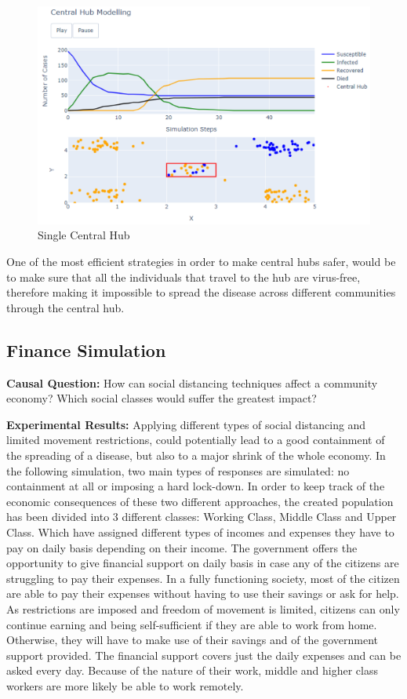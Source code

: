 \begin{figure}[ht!]%
    \centering
    \includegraphics[width=0.85\linewidth]{latex/images/hubs1.pdf}
    \caption{Single Central Hub}
    \label{hub}
\end{figure}

One of the most efficient strategies in order to make central hubs safer, would be to make sure that all the individuals that travel to the hub are virus-free, therefore making it impossible to spread the disease across different communities through the central hub.

\subsection{Finance Simulation}

\textbf{Causal Question:} How can social distancing techniques affect a community economy? Which social classes would suffer the greatest impact?

\textbf{Experimental Results:} Applying different types of social distancing and limited movement restrictions, could potentially lead to a good containment of the spreading of a disease, but also to a major shrink of the whole economy. In the following simulation, two main types of responses are simulated: no containment at all or imposing a hard lock-down. In order to keep track of the economic consequences of these two different approaches, the created population has been divided into 3 different classes: Working Class, Middle Class and Upper Class. Which have assigned different types of incomes and expenses they have to pay on daily basis depending on their income. The government offers the opportunity to give financial support on daily basis in case any of the citizens are struggling to pay their expenses. In a fully functioning society, most of the citizen are able to pay their expenses without having to use their savings or ask for help. As restrictions are imposed and freedom of movement is limited, citizens can only continue earning and being self-sufficient if they are able to work from home. Otherwise, they will have to make use of their savings and of the government support provided. The financial support covers just the daily expenses and can be asked every day. Because of the nature of their work, middle and higher class workers are more likely be able to work remotely.


